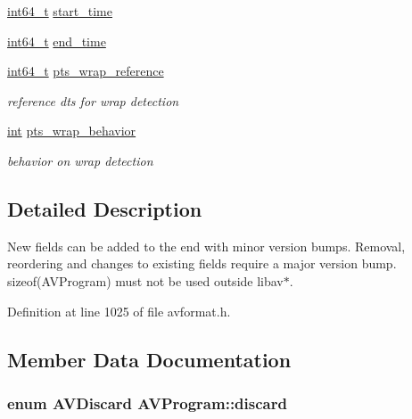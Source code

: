 \begin{DoxyCompactItemize}
\item 
\hyperlink{lib-src_2ffmpeg_2win32_2stdint_8h_a67a9885ef4908cb72ce26d75b694386c}{int64\+\_\+t} \hyperlink{struct_a_v_program_a2276db4d51695120664d527f20b7c532}{start\+\_\+time}
\item 
\hyperlink{lib-src_2ffmpeg_2win32_2stdint_8h_a67a9885ef4908cb72ce26d75b694386c}{int64\+\_\+t} \hyperlink{struct_a_v_program_a5a7795c918153d0f64d68a838e172db4}{end\+\_\+time}
\item 
\hyperlink{lib-src_2ffmpeg_2win32_2stdint_8h_a67a9885ef4908cb72ce26d75b694386c}{int64\+\_\+t} \hyperlink{struct_a_v_program_a7e539e286876577e158039f6e7678452}{pts\+\_\+wrap\+\_\+reference}
\begin{DoxyCompactList}\small\item\em reference dts for wrap detection \end{DoxyCompactList}\item 
\hyperlink{xmltok_8h_a5a0d4a5641ce434f1d23533f2b2e6653}{int} \hyperlink{struct_a_v_program_aa3f8af78093a910ff766ac5af381758b}{pts\+\_\+wrap\+\_\+behavior}
\begin{DoxyCompactList}\small\item\em behavior on wrap detection \end{DoxyCompactList}\end{DoxyCompactItemize}


\subsection{Detailed Description}
New fields can be added to the end with minor version bumps. Removal, reordering and changes to existing fields require a major version bump. sizeof(\+A\+V\+Program) must not be used outside libav$\ast$. 

Definition at line 1025 of file avformat.\+h.



\subsection{Member Data Documentation}
\subsubsection[{\texorpdfstring{discard}{discard}}]{\setlength{\rightskip}{0pt plus 5cm}enum {\bf A\+V\+Discard} A\+V\+Program\+::discard}\hypertarget{struct_a_v_program_a9c7a07c08a1f960aaa49f3f47633af5c}{}\label{struct_a_v_program_a9c7a07c08a1f960aaa49f3f47633af5c}


